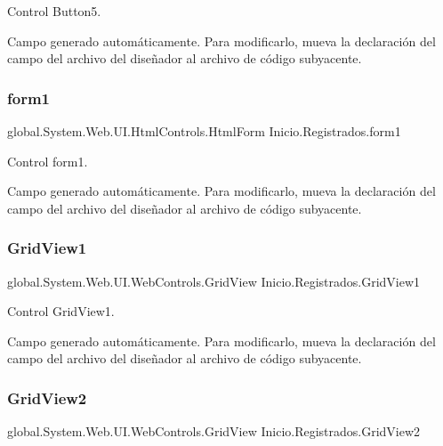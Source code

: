 Control Button5. 

Campo generado automáticamente. Para modificarlo, mueva la declaración del campo del archivo del diseñador al archivo de código subyacente. \mbox{\label{classInicio_1_1Registrados_a902f9075b41d6386d17242fe32dea6e4}} 
\subsubsection{\texorpdfstring{form1}{form1}}
{\footnotesize\ttfamily global.\+System.\+Web.\+U\+I.\+Html\+Controls.\+Html\+Form Inicio.\+Registrados.\+form1\hspace{0.3cm}{\ttfamily [protected]}}



Control form1. 

Campo generado automáticamente. Para modificarlo, mueva la declaración del campo del archivo del diseñador al archivo de código subyacente. \mbox{\label{classInicio_1_1Registrados_aad3adbb47738fefadfe5efa1dfb19b92}} 
\subsubsection{\texorpdfstring{GridView1}{GridView1}}
{\footnotesize\ttfamily global.\+System.\+Web.\+U\+I.\+Web\+Controls.\+Grid\+View Inicio.\+Registrados.\+Grid\+View1\hspace{0.3cm}{\ttfamily [protected]}}



Control Grid\+View1. 

Campo generado automáticamente. Para modificarlo, mueva la declaración del campo del archivo del diseñador al archivo de código subyacente. \mbox{\label{classInicio_1_1Registrados_acf5a95ef87b37efcf6ad23cb0df13110}} 
\subsubsection{\texorpdfstring{GridView2}{GridView2}}
{\footnotesize\ttfamily global.\+System.\+Web.\+U\+I.\+Web\+Controls.\+Grid\+View Inicio.\+Registrados.\+Grid\+View2\hspace{0.3cm}{\ttfamily [protected]}}



